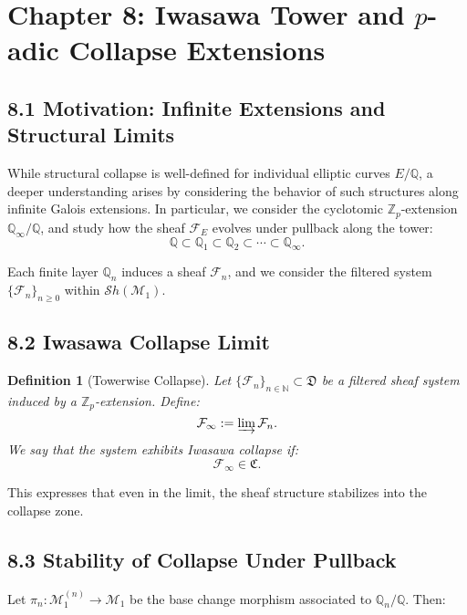 \documentclass[11pt]{article}
\newtheorem{definition}[theorem]{Definition}
\begin{document}
\section{Chapter 8: Iwasawa Tower and \( p \)-adic Collapse Extensions}
\label{sec:iwasawa-collapse}

\subsection*{8.1 Motivation: Infinite Extensions and Structural Limits}

While structural collapse is well-defined for individual elliptic curves \( E/\mathbb{Q} \), a deeper understanding arises by considering the behavior of such structures along infinite Galois extensions. In particular, we consider the cyclotomic \( \mathbb{Z}_p \)-extension \( \mathbb{Q}_\infty/\mathbb{Q} \), and study how the sheaf \( \mathcal{F}_E \) evolves under pullback along the tower:
\[
\mathbb{Q} \subset \mathbb{Q}_1 \subset \mathbb{Q}_2 \subset \cdots \subset \mathbb{Q}_\infty.
\]

Each finite layer \( \mathbb{Q}_n \) induces a sheaf \( \mathcal{F}_n \), and we consider the filtered system \( \{ \mathcal{F}_n \}_{n \geq 0} \) within \( \mathcal{S}h(\mathcal{M}_1) \).

\subsection*{8.2 Iwasawa Collapse Limit}

\begin{definition}[Towerwise Collapse]
Let \( \{ \mathcal{F}_n \}_{n \in \mathbb{N}} \subset \mathfrak{D} \) be a filtered sheaf system induced by a \( \mathbb{Z}_p \)-extension. Define:
\[
\mathcal{F}_\infty := \varinjlim \mathcal{F}_n.
\]
We say that the system exhibits \emph{Iwasawa collapse} if:
\[
\mathcal{F}_\infty \in \mathfrak{C}.
\]
\end{definition}

This expresses that even in the limit, the sheaf structure stabilizes into the collapse zone.

\subsection*{8.3 Stability of Collapse Under Pullback}

Let \( \pi_n : \mathcal{M}_1^{(n)} \to \mathcal{M}_1 \) be the base change morphism associated to \( \mathbb{Q}_n/\mathbb{Q} \). Then:
\end{document}
